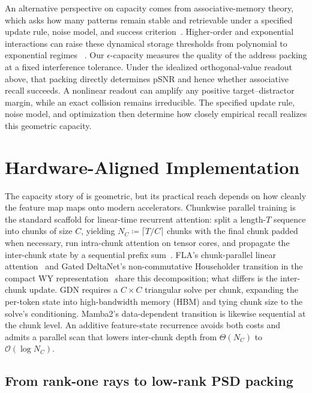 \documentclass{article}
\newcommand{\1}{\bm{1}}
\newcommand{\defeq}{\coloneqq}
\def\eps{{\epsilon}}
\def\gO{{\mathcal{O}}}
\newcommand{\seql}{T}
\theoremstyle{definition}
\begin{document}
An alternative perspective on capacity comes from associative-memory theory, which asks how
many patterns remain stable and retrievable under a specified update rule, noise model, and success
criterion~\citep{krotov25mam}. Higher-order and exponential interactions can raise these dynamical
storage thresholds
from polynomial to exponential regimes
~\citep{krotov16dense,demircigil17model,lucibello24exponential}. Our $\eps$-capacity measures the quality of the address packing at a fixed interference tolerance. Under the idealized orthogonal-value readout above, that packing directly determines pSNR and hence whether associative recall succeeds. A nonlinear readout can amplify any positive target--distractor margin, while an exact collision remains irreducible. The specified update rule, noise model, and optimization then determine how closely empirical recall realizes this geometric capacity.

\section{Hardware-Aligned Implementation} \label{sec:hardware}
The capacity story of  is geometric, but its practical reach depends on how
cleanly the feature map maps onto modern accelerators. Chunkwise parallel training is the standard
scaffold for linear-time recurrent attention: split a length-$\seql$ sequence into chunks of size $C$,
yielding
$N_C\defeq\lceil \seql/C\rceil$ chunks with the final chunk padded when necessary, run intra-chunk
attention on tensor cores, and propagate the inter-chunk state by a sequential prefix
sum~\citep{hua22transformerquality}. FLA's chunk-parallel linear attention~\citep{yang24fla}
and Gated DeltaNet's non-commutative Householder transition in the compact WY
representation~\citep{schreiber89compactwy,yang25gateddeltanet} share this decomposition; what differs
is the inter-chunk update. GDN requires a
$C\!\times\!C$ triangular solve per chunk, expanding the per-token state into
high-bandwidth memory (HBM) and tying chunk size to the solve's conditioning. Mamba2's
data-dependent transition is likewise sequential at the chunk level. An additive feature-state recurrence
avoids both costs and admits a parallel scan that lowers inter-chunk depth from $\Theta(N_C)$ to
$\gO(\log N_C)$.

\subsection{From rank-one rays to low-rank PSD packing}
\label{ssec:hardware-psd-maps}
\end{document}
